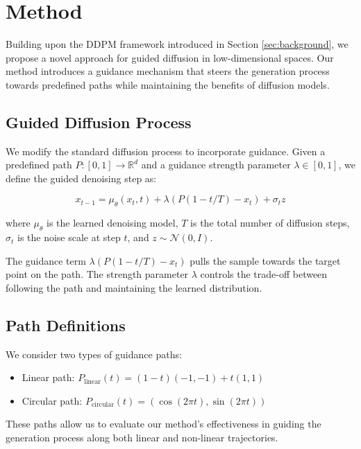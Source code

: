 \documentclass{article} %
\begin{document}
\section{Method}
\label{sec:method}

Building upon the DDPM framework introduced in Section \ref{sec:background}, we propose a novel approach for guided diffusion in low-dimensional spaces. Our method introduces a guidance mechanism that steers the generation process towards predefined paths while maintaining the benefits of diffusion models.

\subsection{Guided Diffusion Process}

We modify the standard diffusion process to incorporate guidance. Given a predefined path $P: [0, 1] \rightarrow \mathbb{R}^d$ and a guidance strength parameter $\lambda \in [0, 1]$, we define the guided denoising step as:

\begin{equation}
    x_{t-1} = \mu_\theta(x_t, t) + \lambda(P(1-t/T) - x_t) + \sigma_t z
\end{equation}

where $\mu_\theta$ is the learned denoising model, $T$ is the total number of diffusion steps, $\sigma_t$ is the noise scale at step $t$, and $z \sim \mathcal{N}(0, I)$.

The guidance term $\lambda(P(1-t/T) - x_t)$ pulls the sample towards the target point on the path. The strength parameter $\lambda$ controls the trade-off between following the path and maintaining the learned distribution.

\subsection{Path Definitions}

We consider two types of guidance paths:

\begin{itemize}
    \item Linear path: $P_{\text{linear}}(t) = (1-t)(-1, -1) + t(1, 1)$
    \item Circular path: $P_{\text{circular}}(t) = (\cos(2\pi t), \sin(2\pi t))$
\end{itemize}

These paths allow us to evaluate our method's effectiveness in guiding the generation process along both linear and non-linear trajectories.
\end{document}

